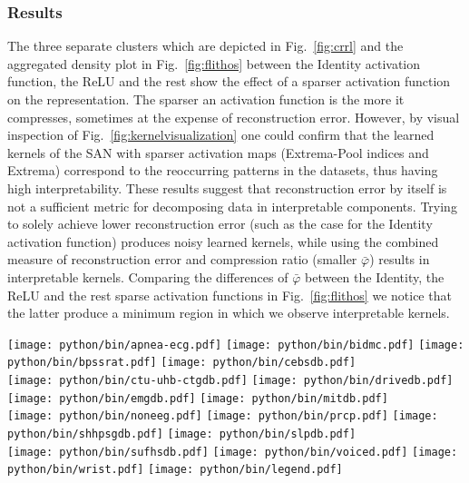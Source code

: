 \documentclass[journal]{IEEEtran}
\begin{document}
\subsubsection{Results}
The three separate clusters which are depicted in Fig.~\ref{fig:crrl} and the aggregated density plot in Fig.~\ref{fig:flithos} between the Identity activation function, the ReLU and the rest show the effect of a sparser activation function on the representation.
The sparser an activation function is the more it compresses, sometimes at the expense of reconstruction error.
However, by visual inspection of Fig.~\ref{fig:kernelvisualization} one could confirm that the learned kernels of the SAN with sparser activation maps (Extrema-Pool indices and Extrema) correspond to the reoccurring patterns in the datasets, thus having high interpretability.
These results suggest that reconstruction error by itself is not a sufficient metric for decomposing data in interpretable components.
Trying to solely achieve lower reconstruction error (such as the case for the Identity activation function) produces noisy learned kernels, while using the combined measure of reconstruction error and compression ratio (smaller $\bar\varphi$) results in interpretable kernels.
Comparing the differences of $\bar\varphi$ between the Identity, the ReLU and the rest sparse activation functions in Fig.~\ref{fig:flithos} we notice that the latter produce a minimum region in which we observe interpretable kernels.

\begin{figure*}[!t]
	\texttt{[image: python/bin/apnea-ecg.pdf]}
	\texttt{[image: python/bin/bidmc.pdf]}
	\texttt{[image: python/bin/bpssrat.pdf]}
	\texttt{[image: python/bin/cebsdb.pdf]}
	\\
	\texttt{[image: python/bin/ctu-uhb-ctgdb.pdf]}
	\texttt{[image: python/bin/drivedb.pdf]}
	\texttt{[image: python/bin/emgdb.pdf]}
	\texttt{[image: python/bin/mitdb.pdf]}
	\\
	\texttt{[image: python/bin/noneeg.pdf]}
	\texttt{[image: python/bin/prcp.pdf]}
	\texttt{[image: python/bin/shhpsgdb.pdf]}
	\texttt{[image: python/bin/slpdb.pdf]}
	\\
	\texttt{[image: python/bin/sufhsdb.pdf]}
	\texttt{[image: python/bin/voiced.pdf]}
	\texttt{[image: python/bin/wrist.pdf]}
	\texttt{[image: python/bin/legend.pdf]}
	\caption{Inverse compression ratio ($CR^{-1}$) vs.\ normalized reconstruction loss ($\tilde{\mathcal{L}}$) for the $15$ datasets of Physionet for various kernel sizes.
	The five inner plots with the yellow background on the right of each subplot, depict the corresponding kernel for the kernel size that achieved the best $\bar\varphi$.}\label{fig:crrl}
\end{figure*}
\end{document}
